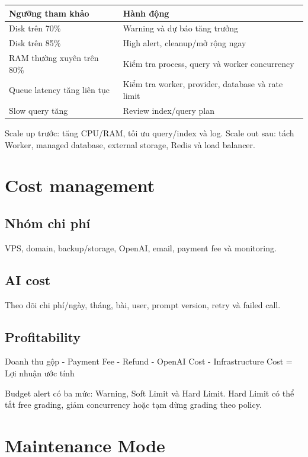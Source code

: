 \documentclass[11pt,a4paper]{article}
\begin{document}
\begin{longtable}{L{0.35\textwidth}L{0.57\textwidth}}
\toprule
\textbf{Ngưỡng tham khảo} & \textbf{Hành động} \\
\midrule
Disk trên 70\% & Warning và dự báo tăng trưởng \\
Disk trên 85\% & High alert, cleanup/mở rộng ngay \\
RAM thường xuyên trên 80\% & Kiểm tra process, query và worker concurrency \\
Queue latency tăng liên tục & Kiểm tra worker, provider, database và rate limit \\
Slow query tăng & Review index/query plan \\
\bottomrule
\end{longtable}

Scale up trước: tăng CPU/RAM, tối ưu query/index và log. Scale out sau: tách Worker, managed database, external storage, Redis và load balancer.

\section{Cost management}

\subsection{Nhóm chi phí}

VPS, domain, backup/storage, OpenAI, email, payment fee và monitoring.

\subsection{AI cost}

Theo dõi chi phí/ngày, tháng, bài, user, prompt version, retry và failed call.

\subsection{Profitability}

\begin{flowbox}
Doanh thu gộp - Payment Fee - Refund - OpenAI Cost - Infrastructure Cost = Lợi nhuận ước tính
\end{flowbox}

Budget alert có ba mức: Warning, Soft Limit và Hard Limit. Hard Limit có thể tắt free grading, giảm concurrency hoặc tạm dừng grading theo policy.

\section{Maintenance Mode}
\end{document}
